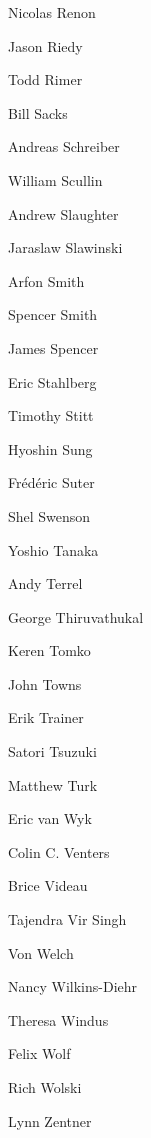 \documentclass[11pt, oneside]{amsart}
\begin{document}
\begin{multicols}{3}
Nicolas Renon

Jason Riedy

Todd Rimer

Bill Sacks

Andreas Schreiber

William Scullin

Andrew Slaughter

Jaraslaw Slawinski

Arfon Smith

Spencer Smith

James Spencer

Eric Stahlberg

Timothy Stitt

Hyoshin Sung

Fr\'{e}d\'{e}ric Suter

Shel Swenson

Yoshio Tanaka

Andy Terrel

George  Thiruvathukal

Keren Tomko

John Towns

Erik Trainer

Satori Tsuzuki

Matthew Turk

Eric van Wyk

Colin C. Venters

Brice Videau

Tajendra Vir Singh

Von Welch

Nancy Wilkins-Diehr

Theresa Windus

Felix Wolf

Rich Wolski

Lynn Zentner

\end{multicols}






\end{document}
